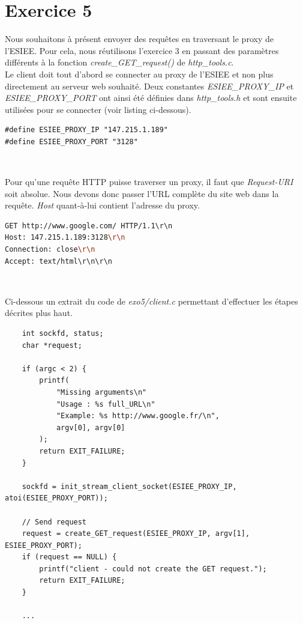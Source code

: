 \section{Exercice 5}
Nous souhaitons à présent envoyer des requêtes en traversant le proxy de l'ESIEE. Pour cela, nous réutilisons l'exercice 3 en passant des paramètres différents à la fonction \emph{create\_GET\_request()} de \emph{http\_tools.c}.\\

Le client doit tout d'abord se connecter au proxy de l'ESIEE et non plus directement au serveur web souhaité. Deux constantes \emph{ESIEE\_PROXY\_IP} et \emph{ESIEE\_PROXY\_PORT} ont ainsi été définies dans \emph{http\_tools.h} et sont ensuite utilisées pour se connecter (voir listing ci-dessous).

\begin{lstlisting}[caption=Extrait de http\_tools.h]
#define ESIEE_PROXY_IP "147.215.1.189"
#define ESIEE_PROXY_PORT "3128"
\end{lstlisting}
\

Pour qu'une requête HTTP puisse traverser un proxy, il faut que \emph{Request-URI} soit absolue. Nous devons donc passer l'URL complète du site web dans la requête. \emph{Host} quant-à-lui contient l'adresse du proxy.

\begin{lstlisting}[caption=Exemple de requête en passant par le proxy de l'ESIEE, language=bash]
GET http://www.google.com/ HTTP/1.1\r\n
Host: 147.215.1.189:3128\r\n
Connection: close\r\n
Accept: text/html\r\n\r\n
\end{lstlisting}
\

\noindent Ci-dessous un extrait du code de \emph{exo5/client.c} permettant d'effectuer les étapes décrites plus haut.

\begin{lstlisting}
    int sockfd, status;
    char *request;

    if (argc < 2) {
        printf(
            "Missing arguments\n"
            "Usage : %s full_URL\n"
            "Example: %s http://www.google.fr/\n",
            argv[0], argv[0]
        );
        return EXIT_FAILURE;
    }

    sockfd = init_stream_client_socket(ESIEE_PROXY_IP, atoi(ESIEE_PROXY_PORT));

    // Send request
    request = create_GET_request(ESIEE_PROXY_IP, argv[1], ESIEE_PROXY_PORT);
    if (request == NULL) {
        printf("client - could not create the GET request.");
        return EXIT_FAILURE;
    }

    ...
\end{lstlisting}
\newpage

